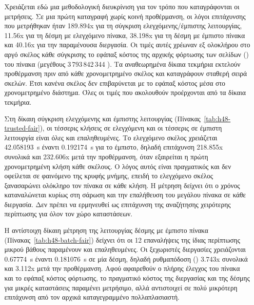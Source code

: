 Χρειάζεται εδώ μια μεθοδολογική διευκρίνιση για τον τρόπο που καταγράφονται οι μετρήσεις. Σε μια πρώτη καταγραφή χωρίς κοινή προθέρμανση, οι λόγοι επιτάχυνσης που μετρήθηκαν ήταν 189.894x για τη σύγκριση ελεγχόμενης/έμπιστης λειτουργίας, 11.56x για τη δέσμη με ελεγχόμενο πίνακα, 38.198x για τη δέσμη με έμπιστο πίνακα και 40.16x για την παραμένουσα διεργασία. Οι τιμές αυτές χρέωναν εξ ολοκλήρου στο αργό σκέλος κάθε σύγκρισης το εφάπαξ κόστος της αρχικής φόρτωσης των σελίδων () του πίνακα (μεγέθους 3\,793\,842\,344 ). Τα αναθεωρημένα δίκαια τεκμήρια εκτελούν προθέρμανση πριν από κάθε χρονομετρημένο σκέλος και καταγράφουν σταθερή σειρά σκελών. Έτσι κανένα σκέλος δεν επιβαρύνεται με το εφάπαξ κόστος μέσα στο χρονομετρημένο διάστημα. Όλες οι τιμές που ακολουθούν προέρχονται από τα δίκαια τεκμήρια.

Στη δίκαιη σύγκριση ελεγχόμενης και έμπιστης λειτουργίας (Πίνακας~\ref{tab:h48-trusted-fair}), οι τέσσερις κλήσεις σε ελεγχόμενη και οι τέσσερις σε έμπιστη λειτουργία είναι όλες  και επαληθευμένες. Το ελεγχόμενο σκέλος χρειάζεται 42.058193~s έναντι 0.192174~s για το έμπιστο, δηλαδή επιτάχυνση 218.855x συνολικά και 232.606x μετά την προθέρμανση, όταν εξαιρείται η πρώτη χρονομετρημένη κλήση κάθε σκέλους. Ο λόγος αυτός είναι πραγματικός και δεν οφείλεται σε φαινόμενο της κρυφής μνήμης, επειδή το ελεγχόμενο σκέλος ξανασαρώνει ολόκληρο τον πίνακα  σε κάθε κλήση. Η μέτρηση δείχνει ότι ο χρόνος καταναλώνεται κυρίως στη σάρωση και την επαλήθευση του μεγάλου πίνακα σε κάθε διεργασία. Δεν πρέπει να ερμηνευθεί ως επιτάχυνση της αναζήτησης χειρότερης περίπτωσης για όλον τον χώρο καταστάσεων.

\begin{table}[htbp]\centering

\caption[Δίκαιη σύγκριση ελεγχόμενης και έμπιστης χρήσης του πίνακα h48h7]{Δίκαιη σύγκριση ελεγχόμενης και έμπιστης χρήσης του πίνακα , με κοινή προθέρμανση ώστε κανένα σκέλος να μη χρεώνεται το εφάπαξ ψυχρό κόστος φόρτωσης. Πηγή: .}
\label{tab:h48-trusted-fair}
\end{table}

Η αντίστοιχη δίκαιη μέτρηση της λειτουργίας δέσμης με έμπιστο πίνακα (Πίνακας~\ref{tab:h48-batch-fair}) δείχνει ότι οι 12 επαναλήψεις της ίδιας περίπτωσης μικρού βάθους παραμένουν  και επαληθευμένες. Οι ξεχωριστές διεργασίες χρειάζονται 0.67774~s έναντι 0.181076~s σε μία δέσμη, δηλαδή ρυθμαπόδοση () 3.743x συνολικά και 3.112x μετά την προθέρμανση. Αφού αφαιρεθούν ο πλήρης έλεγχος του πίνακα και το εφάπαξ κόστος φόρτωσης, το πραγματικό κόστος της διεργασίας και της δέσμης για μικρές καταστάσεις παραμένει μετρήσιμο, αλλά αντιστοιχεί σε πολύ μικρότερη επιτάχυνση από τον αρχικά καταγεγραμμένο πολλαπλασιαστή.

